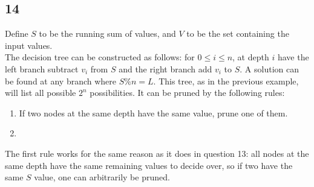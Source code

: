 \documentclass[letterpaper,notitlepage,twoside]{article}
\begin{document}
\subsection*{14}
Define $S$ to be the running sum of values, and $V$ to be the set containing the input values. \\
The decision tree can be constructed as follows: for $0\leq i \leq n$, at depth $i$ have the left branch subtract $v_i$ from $S$ and the right branch add $v_i$ to $S$. A solution can be found at any branch where $S\% n = L$. This tree, as in the previous example, will list all possible $2^n$ possibilities. It can be pruned by the following rules:   
\begin{enumerate}
\item If two nodes at the same depth have the same value, prune one of them. 
\item
\end{enumerate}
The first rule works for the same reason as it does in question 13: all nodes at the same depth have the same remaining values to decide over, so if two have the same $S$ value, one can arbitrarily be pruned. 
\end{document}
